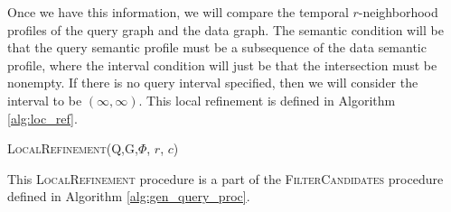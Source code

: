 Once we have this information, we will compare the temporal $r$-neighborhood
profiles of the query graph and the data graph. The semantic condition will be
that the query semantic profile must be a subsequence of the data semantic
profile, where the interval condition will just be that the intersection must be
nonempty.  If there is no query interval specified, then we will consider the
interval to be $(\infty, \infty)$. This local refinement is defined in Algorithm
\ref{alg:loc_ref}.

\begin{algorithm}
  \label{alg:loc_ref}
  \caption{\textsc{LocalRefinement(Q,G,$\Phi$, $r$, $c$)}}
  \SetAlgoLined

\end{algorithm}

This \textsc{LocalRefinement} procedure is a part of the
\textsc{FilterCandidates} procedure defined in Algorithm
\ref{alg:gen_query_proc}.


